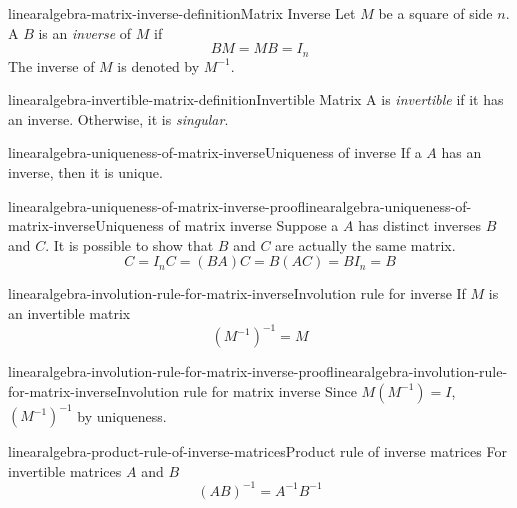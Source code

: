 \documentclass[preview]{standalone}
\begin{document}
\begin{snippetdefinition}{linearalgebra-matrix-inverse-definition}{Matrix Inverse}
    Let \(M\) be a square \matrix of side \(n\).
    A \matrix \(B\) is an \textit{inverse}
    of \(M\) if \[BM=MB=I_n\]
    The inverse of \(M\) is denoted by \(M^{-1}\).
\end{snippetdefinition}

\begin{snippetdefinition}{linearalgebra-invertible-matrix-definition}{Invertible Matrix}
    A \matrix is \textit{invertible} if it has an inverse.
    Otherwise, it is \textit{singular}.
\end{snippetdefinition}

\begin{snippetproposition}{linearalgebra-uniqueness-of-matrix-inverse}{Uniqueness of \matrix inverse}
    If a \matrix \(A\) has an inverse, then it is unique.
\end{snippetproposition}

\begin{snippetproof}{linearalgebra-uniqueness-of-matrix-inverse-proof}{linearalgebra-uniqueness-of-matrix-inverse}{Uniqueness of matrix inverse}
    Suppose a \matrix \(A\) has distinct inverses \(B\)
    and \(C\).
    It is possible to show that \(B\) and \(C\) are actually
    the same matrix.
    \[
        C=I_n C = (BA) C = B (AC) = BI_n = B
    \]
\end{snippetproof}

\begin{snippetproposition}{linearalgebra-involution-rule-for-matrix-inverse}{Involution rule for \matrix inverse}
    If \(M\) is an invertible matrix
    \[
        {(M^{-1})}^{-1} = M
    \]
\end{snippetproposition}

\begin{snippetproof}{linearalgebra-involution-rule-for-matrix-inverse-proof}{linearalgebra-involution-rule-for-matrix-inverse}{Involution rule for matrix inverse}
    Since \(M(M^{-1}) = I\), \({(M^{-1})}^{-1}\)
    by uniqueness. %
\end{snippetproof}

\begin{snippetproposition}{linearalgebra-product-rule-of-inverse-matrices}{Product rule of inverse matrices}
    For invertible matrices \(A\) and \(B\)
    \[
        {(AB)}^{-1} = A^{-1} B^{-1}
    \]
\end{snippetproposition}
\end{document}
